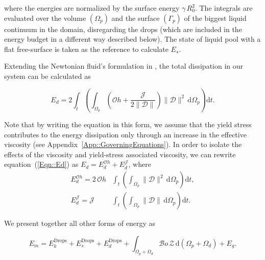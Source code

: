 \documentclass[final]{jfm}
\begin{document}
\noindent where the energies are normalized by the surface energy $\gamma \, R_0^2$. The integrals are evaluated over the volume $\left(\Omega_p\right)$ and the surface $\left(\Gamma_p\right)$ of the biggest liquid continuum in the domain, disregarding the drops (which are included in the energy budget in a different way described below). The state of liquid pool with a flat free-surface is taken as the reference to calculate $E_s$. 

Extending the Newtonian fluid's formulation in \citet[p.~50-51]{landau2013course}, the total dissipation in our system can be calculated as

\begin{equation}\label{Eqn::Ed}
	E_d = 2\int_t\left(\int_{\Omega_p}\left(\mathcal{O}h + \frac{\mathcal{J}}{2\|\boldsymbol{\mathcal{D}}\|}\right)\|\boldsymbol{\mathcal{D}}\|^2\,\mathrm{d}\Omega_p\right)\mathrm{d}t.
\end{equation}

\noindent Note that by writing the equation in this form, we assume that the yield stress contributes to the energy dissipation only through an increase in the effective viscosity (see Appendix~\ref{App::GoverningEquations}). In order to isolate the effects of the viscosity and yield-stress associated viscosity, we can rewrite equation~(\ref{Eqn::Ed}) as $E_d = E_d^{\mathcal{O}h} + E_d^\mathcal{J}$, where
\begin{align}
	\label{Eqn::EdOh}
	E_d^{\mathcal{O}h} = 2\, \mathcal{O}h&\int_t\left(\int_{\Omega_p}\|\boldsymbol{\mathcal{D}}\|^2\,\mathrm{d}\Omega_p\right)\mathrm{d}t,\\
	\label{Eqn::EdJ}
	E_d^\mathcal{J} = \mathcal{J}&\int_t\left(\int_{\Omega_p}\|\boldsymbol{\mathcal{D}}\|\,\mathrm{d}\Omega_p\right)\mathrm{d}t.
\end{align}

We present together all other forms of energy as

\begin{equation}\label{Eqn::Em}
	E_m = E_k^\text{Drops} + E_s^\text{Drops} + E_d^\text{Drops} + \int_{\Omega_p+\Omega_d}\mathcal{B}o\,\mathcal{Z}\,\mathrm{d}\left(\Omega_p+\Omega_d\right)  + E_g. 
\end{equation}
\end{document}
